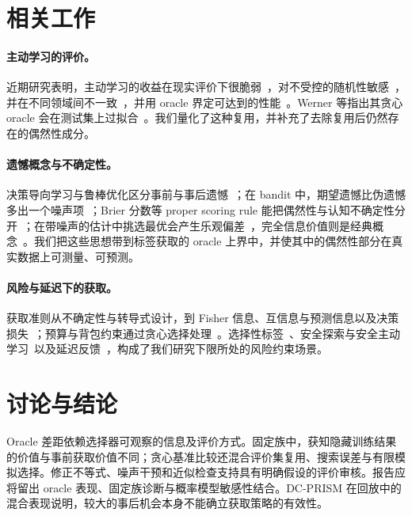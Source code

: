 \documentclass[runningheads]{llncs}
\begin{document}
\section{相关工作}
\label{sec:related}
\paragraph{主动学习的评价。}近期研究表明，主动学习的收益在现实评价下很脆弱~\cite{luth2023navigating}，对不受控的随机性敏感~\cite{ji2023randomness}，并在不同领域间不一致~\cite{werner2023comparable,werner2024cdalbench}，并用 oracle 界定可达到的性能~\cite{werner2024cdalbench,huseljic2026boss}。Werner 等指出其贪心 oracle 会在测试集上过拟合~\cite{werner2023comparable}。我们量化了这种复用，并补充了去除复用后仍然存在的偶然性成分。

\paragraph{遗憾概念与不确定性。}决策导向学习与鲁棒优化区分事前与事后遗憾~\cite{schutte2023robust}；在 bandit 中，期望遗憾比伪遗憾多出一个噪声项~\cite{bubeck2012regret,audibert2010regret}；Brier 分数等 proper scoring rule 能把偶然性与认知不确定性分开~\cite{hofman2024quantifying}；在带噪声的估计中挑选最优会产生乐观偏差~\cite{smith2006optimizer,cawley2010overfitting}，完全信息价值则是经典概念~\cite{howard1966information,raiffa1961applied}。我们把这些思想带到标签获取的 oracle 上界中，并使其中的偶然性部分在真实数据上可测量、可预测。

\paragraph{风险与延迟下的获取。}获取准则从不确定性与转导式设计，到 Fisher 信息、互信息与预测信息以及决策损失~\cite{cohn1996active,settles2009active,lewis1994sequential,yu2006transductive,ash2021fishing,kirsch2019batchbald,bickfordsmith2023prediction,huang2026loss,chaloner1995bayesian}；预算与背包约束通过贪心选择处理~\cite{krause2005near,sviridenko2004note,tomanek2010cost}。选择性标签~\cite{lakkaraju2017selective,wei2021selective,kilbertus2020fair,keswani2024partial,crook2004reject}、安全探索与安全主动学习~\cite{sui2015safe,schreiter2015safe,wu2016conservative}以及延迟反馈~\cite{joulani2013delayed,chapelle2014delayed,pham2022latency}，构成了我们研究下限所处的风险约束场景。

\section{讨论与结论}
\label{sec:conclusion}
Oracle 差距依赖选择器可观察的信息及评价方式。固定族中，获知隐藏训练结果的价值与事前获取价值不同；贪心基准比较还混合评价集复用、搜索误差与有限模拟选择。修正不等式、噪声干预和近似检查支持具有明确假设的评价审核。报告应将留出 oracle 表现、固定族诊断与概率模型敏感性结合。DC-PRISM 在回放中的混合表现说明，较大的事后机会本身不能确立获取策略的有效性。
\end{document}

